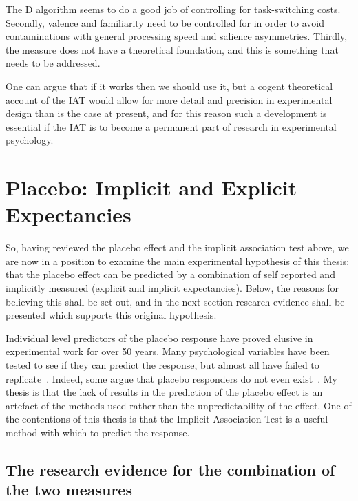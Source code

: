 The D algorithm seems to do a good job of controlling for task-switching costs. Secondly, valence and familiarity need to be controlled for in order to avoid contaminations with general processing speed and salience asymmetries. Thirdly, the measure does not have a theoretical foundation, and this is something that needs to be addressed. 

One can argue that if it works then we should use it, but a cogent theoretical account of the IAT would allow for more detail and precision in experimental design  than is the case at present, and for this reason such a development is essential if the IAT is to become a permanent part of research in experimental psychology.



\section{Placebo: Implicit and Explicit Expectancies}
\label{sec:measurement-placebo}




So, having reviewed the placebo effect and the implicit association test above, we are now in a position to examine the main experimental hypothesis of this thesis: that the placebo effect can be predicted by a combination of self reported and implicitly measured (explicit and implicit expectancies). Below, the reasons for believing this shall be set out, and in the next section  research evidence shall be presented which supports this original hypothesis. 

Individual level predictors of the placebo response have proved elusive in experimental work for over 50 years. Many psychological variables have been tested to see if they can predict the response, but almost all have failed to replicate~\cite{Shapiro1997}. Indeed, some argue that placebo responders do not even exist~\cite{Kaptchuk2008a}. My thesis is that the lack of results in the prediction of the placebo effect is an artefact of the methods used rather than the unpredictability of the effect. One of the contentions of this thesis is that the Implicit Association Test is a useful method with which to predict the response. 


\subsection{The research evidence for the combination of the two measures}
\label{sec:rese-base-comb}

